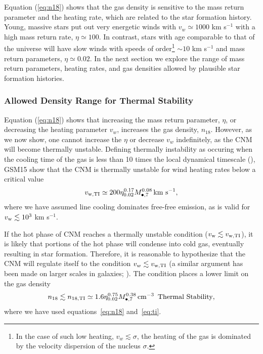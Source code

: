 \documentclass[usenatbib,fleqn]{mnras}
\newcommand{\Mbh}[1][]{M_{\bullet#1}}
\begin{document}
Equation (\ref{eq:n18}) shows that the gas density is sensitive to the mass return parameter and the heating rate, which are
related to the star formation history. Young, massive stars put out
very energetic winds with $v_w\simeq 1000$ km s$^{-1}$ with a high mass
return rate, $\eta\simeq 100$.  In contrast, stars with age comparable
to that of the universe will have slow winds with speeds of order\footnote{In the case of such low heating, $v_w \lesssim \sigma$, the heating of the gas is dominated by the velocity dispersion of the nucleus $\sigma$.} $\sim
10$ km s$^{-1}$ and mass return parameters, $\eta\simeq0.02$. In the next
section we explore the range of mass return parameters, heating rates,
and gas densities allowed by plausible star formation histories.

\subsubsection{Allowed Density Range for Thermal Stability}

Equation (\ref{eq:n18}) shows that increasing the mass return parameter, $\eta$, or decreasing the heating parameter $v_w$, increases the gas density, $n_{18}$.  However, as we now show, one cannot increase the $\eta$ or decrease $v_w$ indefinitely, as the CNM will become thermally unstable.  Defining thermally instability as occuring when the cooling time of the gas is less than 10 times the local dynamical timescale (\citealt{McCourt+11}), GSM15 show that the CNM is thermally unstable for wind heating rates below a critical value 
\begin{equation}
v_{\rm w,TI}\simeq 200 \eta_{0.02}^{0.17} \Mbh[,7]^{0.08} \,{\rm km \,\,s^{-1}},
\label{eq:ti}
\end{equation}
where we have assumed line cooling dominates free-free emission, as is valid for $v_{\rm w} \lesssim 10^{3}$ km s$^{-1}$.

If the hot phase of CNM reaches a thermally unstable condition ($v_{\rm w} \lesssim v_{\rm w,TI}$), it is likely that portions of the hot phase will condense into cold gas, eventually resulting in star formation.  Therefore, it is reasonable to hypothesize that the CNM will regulate itself to the condition $v_w \lesssim v_{\rm w,TI}$ (a similar argument has been made on larger scales in galaxies; \citealt{Voit+15}).  The condition places a lower limit on the gas density
\begin{equation}
n_{18} \lesssim n_{\rm 18,TI}\simeq 1.6 \eta_{0.02}^{0.75} \Mbh[,7]^{0.38} \, {\rm cm^{-3}}\,\,\,\text{Thermal Stability}
\label{eq:n18ti},
\end{equation}
where we have used equations~\eqref{eq:n18} and~\eqref{eq:ti}.
\end{document}
